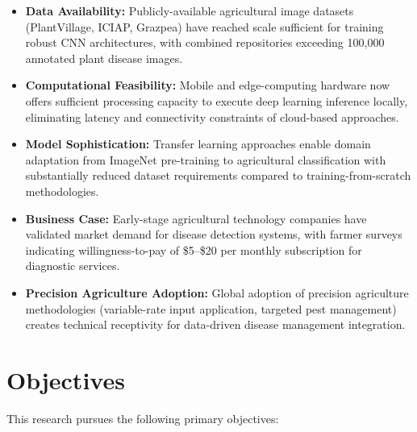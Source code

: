 \documentclass[conference]{IEEEtran}
\begin{document}
\begin{itemize}
\item \textbf{Data Availability:} Publicly-available agricultural image datasets (PlantVillage, ICIAP, Grazpea) have reached scale sufficient for training robust CNN architectures, with combined repositories exceeding 100,000 annotated plant disease images.

\item \textbf{Computational Feasibility:} Mobile and edge-computing hardware now offers sufficient processing capacity to execute deep learning inference locally, eliminating latency and connectivity constraints of cloud-based approaches.

\item \textbf{Model Sophistication:} Transfer learning approaches enable domain adaptation from ImageNet pre-training to agricultural classification with substantially reduced dataset requirements compared to training-from-scratch methodologies.

\item \textbf{Business Case:} Early-stage agricultural technology companies have validated market demand for disease detection systems, with farmer surveys indicating willingness-to-pay of \$5--\$20 per monthly subscription for diagnostic services.

\item \textbf{Precision Agriculture Adoption:} Global adoption of precision agriculture methodologies (variable-rate input application, targeted pest management) creates technical receptivity for data-driven disease management integration.
\end{itemize}

\section{Objectives}
\label{sec:objectives}

This research pursues the following primary objectives:
\end{document}
